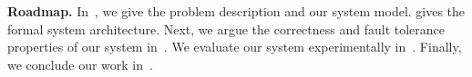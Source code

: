 \textbf{Roadmap.\quad}
In~,
we give the problem description and our system model.
 gives the formal system architecture.
Next, we argue the correctness and fault tolerance properties of our system in~.
We evaluate our system experimentally in~.
Finally, we conclude our work in~.
